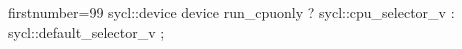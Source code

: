 \begin{cppcode*}{firstnumber=99}
        sycl::device device { 
          run_cpuonly ? sycl::cpu_selector_v : sycl::default_selector_v 
        };
\end{cppcode*}
